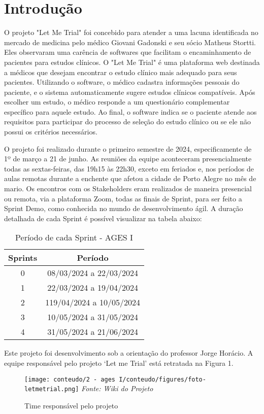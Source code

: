 \section[Introdução]{Introdução}

O projeto "Let Me Trial" foi concebido para atender a uma lacuna identificada no mercado de medicina pelo médico Giovani Gadonski e seu sócio Matheus Stortti. Eles observaram uma carência de softwares que facilitam o encaminhamento de pacientes para estudos clínicos. O "Let Me Trial" é uma plataforma web destinada a médicos que desejam encontrar o estudo clínico mais adequado para seus pacientes. Utilizando o software, o médico cadastra informações pessoais do paciente, e o sistema automaticamente sugere estudos clínicos compatíveis. Após escolher um estudo, o médico responde a um questionário complementar específico para aquele estudo. Ao final, o software indica se o paciente atende aos requisitos para participar do processo de seleção do estudo clínico ou se ele não possui os critérios necessários.

O projeto foi realizado durante o primeiro semestre de 2024, especificamente de 1º de março a 21 de junho. As reuniões da equipe aconteceram presencialmente todas as sextas-feiras, das 19h15 às 22h30, exceto em feriados e, nos períodos de aulas remotas durante a enchente que afetou a cidade de Porto Alegre no mês de mario. Os encontros com os Stakeholders eram realizados de maneira presencial ou remota, via a plataforma Zoom, todas as finais de Sprint, para ser feito a Sprint Demo, como conhecida no mundo de desenvolvimento ágil. A duração detalhada de cada Sprint é possível visualizar na tabela abaixo:

\begin{table}[H]
    \centering
    \caption{Período de cada Sprint - AGES I}
    \begin{tabular}{|c|c|}
        \hline
        \textbf{Sprints} & \textbf{Período} \\
        \hline
        0 & 08/03/2024 a 22/03/2024\\
        1 & 22/03/2024 a 19/04/2024 \\
        2 & 119/04/2024 a 10/05/2024 \\
        3 & 10/05/2024 a 31/05/2024 \\
        4 & 31/05/2024 a 21/06/2024 \\
        \hline
    \end{tabular}
\end{table}

Este projeto foi desenvolvimento sob a orientação do professor Jorge Horácio. A equipe responsável pelo projeto ‘Let me Trial’ está retratada na Figura 1.

\begin{figure}[H]
    \centering
    \small
    \caption{Time responsável pelo projeto}
    \texttt{[image: conteudo/2 - ages I/conteudo/figures/foto-letmetrial.png]}
    \textit{Fonte: Wiki do Projeto}
    \label{fig:projeto-time}
\end{figure}